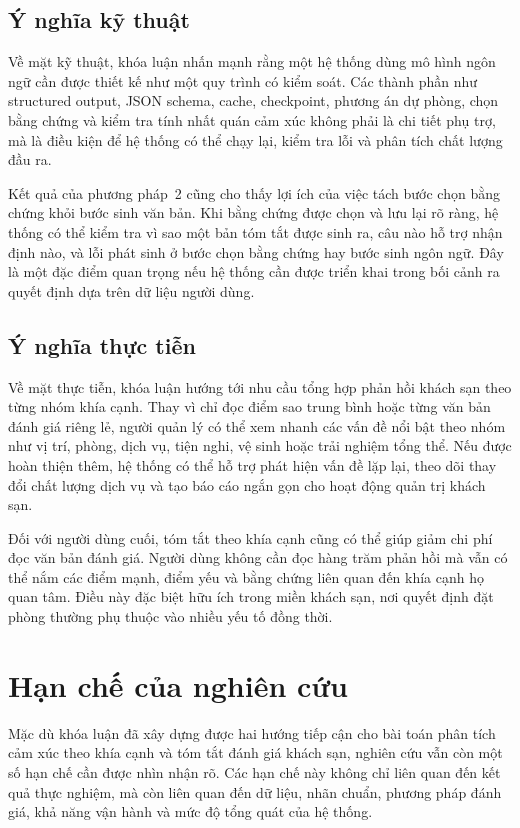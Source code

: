 \subsection{Ý nghĩa kỹ thuật}

Về mặt kỹ thuật, khóa luận nhấn mạnh rằng một hệ thống dùng mô hình ngôn ngữ cần được thiết kế như một quy trình có kiểm soát. Các thành phần như structured output, JSON schema, cache, checkpoint, phương án dự phòng, chọn bằng chứng và kiểm tra tính nhất quán cảm xúc không phải là chi tiết phụ trợ, mà là điều kiện để hệ thống có thể chạy lại, kiểm tra lỗi và phân tích chất lượng đầu ra.

Kết quả của phương pháp~2 cũng cho thấy lợi ích của việc tách bước chọn bằng chứng khỏi bước sinh văn bản. Khi bằng chứng được chọn và lưu lại rõ ràng, hệ thống có thể kiểm tra vì sao một bản tóm tắt được sinh ra, câu nào hỗ trợ nhận định nào, và lỗi phát sinh ở bước chọn bằng chứng hay bước sinh ngôn ngữ. Đây là một đặc điểm quan trọng nếu hệ thống cần được triển khai trong bối cảnh ra quyết định dựa trên dữ liệu người dùng.

\subsection{Ý nghĩa thực tiễn}

Về mặt thực tiễn, khóa luận hướng tới nhu cầu tổng hợp phản hồi khách sạn theo từng nhóm khía cạnh. Thay vì chỉ đọc điểm sao trung bình hoặc từng văn bản đánh giá riêng lẻ, người quản lý có thể xem nhanh các vấn đề nổi bật theo nhóm như vị trí, phòng, dịch vụ, tiện nghi, vệ sinh hoặc trải nghiệm tổng thể. Nếu được hoàn thiện thêm, hệ thống có thể hỗ trợ phát hiện vấn đề lặp lại, theo dõi thay đổi chất lượng dịch vụ và tạo báo cáo ngắn gọn cho hoạt động quản trị khách sạn.

Đối với người dùng cuối, tóm tắt theo khía cạnh cũng có thể giúp giảm chi phí đọc văn bản đánh giá. Người dùng không cần đọc hàng trăm phản hồi mà vẫn có thể nắm các điểm mạnh, điểm yếu và bằng chứng liên quan đến khía cạnh họ quan tâm. Điều này đặc biệt hữu ích trong miền khách sạn, nơi quyết định đặt phòng thường phụ thuộc vào nhiều yếu tố đồng thời.

\section{Hạn chế của nghiên cứu}
\label{sec:chap5-han-che}

Mặc dù khóa luận đã xây dựng được hai hướng tiếp cận cho bài toán phân tích cảm xúc theo khía cạnh và tóm tắt đánh giá khách sạn, nghiên cứu vẫn còn một số hạn chế cần được nhìn nhận rõ. Các hạn chế này không chỉ liên quan đến kết quả thực nghiệm, mà còn liên quan đến dữ liệu, nhãn chuẩn, phương pháp đánh giá, khả năng vận hành và mức độ tổng quát của hệ thống.

